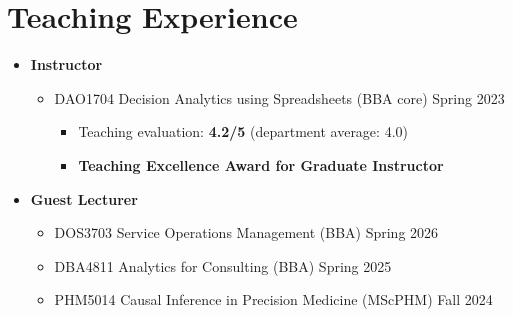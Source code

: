 \documentclass[12pt, a4paper]{article}
\begin{document}
{%

\section*{Teaching Experience}

\begin{itemize}

	\item[] \textbf{Instructor}
	\begin{itemize}
		\item DAO1704 Decision Analytics using Spreadsheets (BBA core) \hfill Spring 2023
		\begin{itemize}
			\item {\footnotesize Teaching evaluation: \textbf{4.2/5} (department average: 4.0)}
			\item {\footnotesize \textbf{Teaching Excellence Award for Graduate Instructor}}
		\end{itemize}
	\end{itemize}

	\item[] \textbf{Guest Lecturer}
	\begin{itemize}
		\item DOS3703 Service Operations Management (BBA) \hfill Spring 2026
		\item DBA4811 Analytics for Consulting (BBA) \hfill Spring 2025
		\item PHM5014 Causal Inference in Precision Medicine (MScPHM) \hfill Fall 2024
	\end{itemize}


\end{itemize}}
\end{document}
